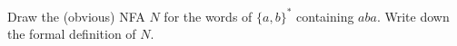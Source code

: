 Draw the (obvious) NFA $N$ for the words of $\{a,b\}^*$ containing $aba$.
Write down the formal definition of $N$.
